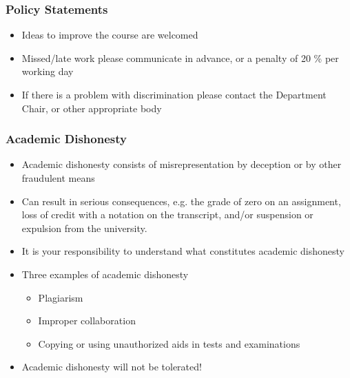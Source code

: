 \documentclass[t,12pt,numbers,fleqn]{beamer}
\begin{document}

\begin{frame}
\frametitle{Policy Statements}

\begin {itemize}

\item Ideas to improve the course are welcomed
\item Missed/late work please communicate in advance, or a penalty of 20 \% per
  working day
\item If there is a problem with discrimination please contact the Department
  Chair, or other appropriate body

\end{itemize}

\end{frame}


\begin{frame}
\frametitle{Academic Dishonesty}

\begin {itemize}

\item Academic dishonesty consists of misrepresentation by deception or by other fraudulent means
\item Can result in serious consequences, e.g. the grade of zero on an assignment, loss of credit with a notation on
the transcript, and/or suspension or expulsion from the university.
\item It is your responsibility to understand what constitutes academic dishonesty
\item Three examples of academic dishonesty
\begin{itemize}
\item Plagiarism
\item Improper collaboration
\item Copying or using unauthorized aids in tests and examinations
\end{itemize}
\item Academic dishonesty will not be tolerated!
\end{itemize}

\end{frame}

\end{document}
